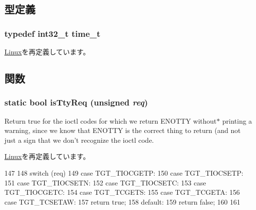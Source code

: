 \subsection{型定義}
\hypertarget{classPowerLinux_a9c837e14046ebcf4099bb559bd6637ca}{
\subsubsection[{time\_\-t}]{\setlength{\rightskip}{0pt plus 5cm}typedef int32\_\-t {\bf time\_\-t}}}
\label{classPowerLinux_a9c837e14046ebcf4099bb559bd6637ca}


\hyperlink{classLinux_a7f5991675a84025dc7c24754a9b257c0}{Linux}を再定義しています。

\subsection{関数}
\hypertarget{classPowerLinux_ab20bdd4422ecf6e1736a5587be296b3f}{
\subsubsection[{isTtyReq}]{\setlength{\rightskip}{0pt plus 5cm}static bool isTtyReq (unsigned {\em req})}}
\label{classPowerLinux_ab20bdd4422ecf6e1736a5587be296b3f}
Return true for the ioctl codes for which we return ENOTTY without$\ast$ printing a warning, since we know that ENOTTY is the correct thing to return (and not just a sign that we don't recognize the ioctl code. 

\hyperlink{classLinux_ab20bdd4422ecf6e1736a5587be296b3f}{Linux}を再定義しています。


\begin{DoxyCode}
147     {
148         switch (req) {
149           case TGT_TIOCGETP:
150           case TGT_TIOCSETP:
151           case TGT_TIOCSETN:
152           case TGT_TIOCSETC:
153           case TGT_TIOCGETC:
154           case TGT_TCGETS:
155           case TGT_TCGETA:
156           case TGT_TCSETAW:
157             return true;
158           default:
159             return false;
160         }
161     }
\end{DoxyCode}


